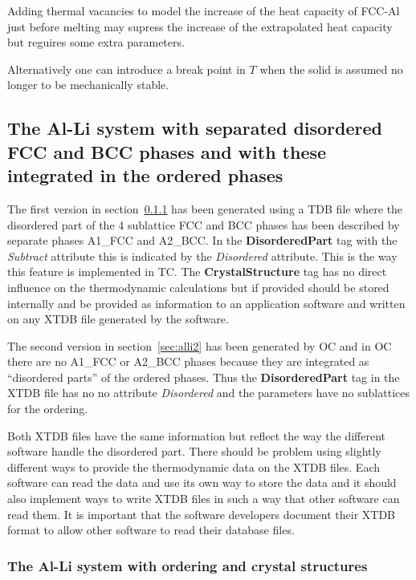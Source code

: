 \documentclass{article}
\begin{document}
\begin{appendices}
Adding thermal vacancies to model the increase of the heat capacity of
FCC-Al just before melting may supress the increase of the
extrapolated heat capacity but reguires some extra parameters.

Alternatively one can introduce a break point in $T$ when the solid is
assumed no longer to be mechanically stable.

\newpage

\subsection{The Al-Li system with separated disordered FCC and BCC phases
  and with these integrated in the ordered phases}

The first version in section~\ref{sec:alli1} has been generated using
a TDB file where the disordered part of the 4 sublattice FCC and BCC
phases has been described by separate phases A1\_FCC and A2\_BCC.  In
the {\bf DisorderedPart} tag with the {\em Subtract} attribute this is
indicated by the {\em Disordered} attribute.  This is the way this
feature is implemented in TC.  The {\bf CrystalStructure} tag has no
direct influence on the thermodynamic calculations but if provided
should be stored internally and be provided as information to an
application software and written on any XTDB file generated by the
software.

The second version in section~\ref{sec:alli2} has been generated by OC
and in OC there are no A1\_FCC or A2\_BCC phases because they are
integrated as ``disordered parts'' of the ordered phases.  Thus the
{\bf DisorderedPart} tag in the XTDB file has no no attribute {\em
  Disordered} and the parameters have no sublattices for the ordering.

Both XTDB files have the same information but reflect the way the
different software handle the disordered part.  There should be
problem using slightly different ways to provide the thermodynamic
data on the XTDB files.  Each software can read the data and use its
own way to store the data and it should also implement ways to write
XTDB files in such a way that other software can read them.  It is
important that the software developers document their XTDB format to
allow other software to read their database files.


\subsubsection{The Al-Li system with ordering and crystal structures}\label{sec:alli1}


\end{appendices}
\end{document}
